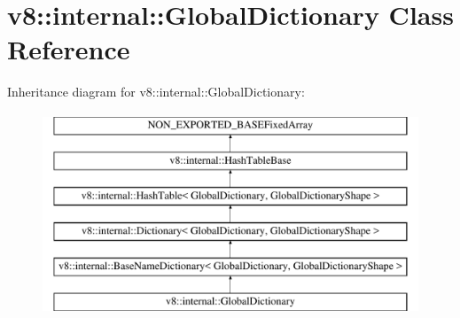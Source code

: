 \hypertarget{classv8_1_1internal_1_1GlobalDictionary}{}\section{v8\+:\+:internal\+:\+:Global\+Dictionary Class Reference}
\label{classv8_1_1internal_1_1GlobalDictionary}
Inheritance diagram for v8\+:\+:internal\+:\+:Global\+Dictionary\+:\begin{figure}[H]
\begin{center}
\leavevmode
\includegraphics[height=6.000000cm]{classv8_1_1internal_1_1GlobalDictionary}
\end{center}
\end{figure}
